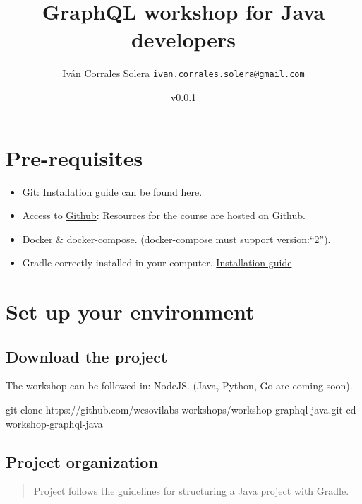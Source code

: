\documentclass[]{book}
\title{GraphQL workshop for Java developers}
\author{Iván Corrales Solera
\href{mailto:ivan.corrales.solera@gmail.com}{\nolinkurl{ivan.corrales.solera@gmail.com}}}
\date{v0.0.1}
\newenvironment{Shaded}{\begin{snugshade}}{\end{snugshade}}
\newcommand{\FunctionTok}[1]{\textcolor[rgb]{0.00,0.00,0.00}{#1}}
\newcommand{\BuiltInTok}[1]{#1}
\newcommand{\NormalTok}[1]{#1}
\begin{document}
\maketitle

{
\setcounter{tocdepth}{1}
\tableofcontents
}
\chapter{Pre-requisites}\label{pre-requisites}

\begin{itemize}
\item
  Git: Installation guide can be found
  \href{https://git-scm.com/book/en/v2/Getting-Started-Installing-Git}{here}.
\item
  Access to \href{https://www.github.com}{Github}: Resources for the
  course are hosted on Github.
\item
  Docker \& docker-compose. (docker-compose must support version:``2'').
\item
  Gradle correctly installed in your computer.
  \href{https://gradle.org/install/}{Installation guide}
\end{itemize}

\chapter{Set up your environment}\label{set-up-your-environment}

\section{Download the project}\label{download-the-project}

The workshop can be followed in: NodeJS. (Java, Python, Go are coming
soon).

\begin{Shaded}
\begin{Highlighting}[]
\FunctionTok{git}\NormalTok{ clone https://github.com/wesovilabs-workshops/workshop-graphql-java.git}
\BuiltInTok{cd}\NormalTok{ workshop-graphql-java}
\end{Highlighting}
\end{Shaded}

\section{Project organization}\label{project-organization}

\begin{quote}
Project follows the guidelines for structuring a Java project with
Gradle.
\end{quote}
\end{document}
